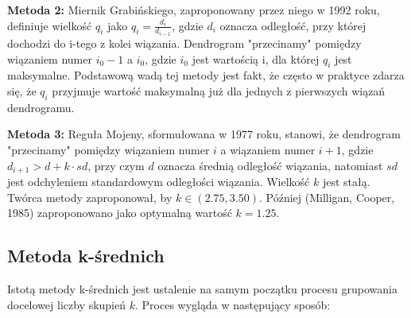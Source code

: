 \documentclass{article}
\begin{document}
\textbf{Metoda 2:} Miernik Grabińskiego, zaproponowany przez niego w 1992 roku, definiuje wielkość $q_i$ jako $q_i = \frac{d_i}{d_{i-1}}$, gdzie $d_i$ oznacza odległość, przy której dochodzi do i-tego z kolei wiązania. Dendrogram "przecinamy" pomiędzy wiązaniem numer $i_0 - 1$ a $i_0$, gdzie $i_0$ jest wartością i, dla której $q_i$ jest maksymalne. Podstawową wadą tej metody jest fakt, że często w praktyce zdarza się, że $q_i$ przyjmuje wartość maksymalną już dla jednych z pierwszych wiązań dendrogramu.

\textbf{Metoda 3:} Reguła Mojeny, sformułowana w 1977 roku, stanowi, że dendrogram "przecinamy" pomiędzy wiązaniem numer $i$ a wiązaniem numer $i + 1$, gdzie $d_{i+1} > d + k \cdot sd$, przy czym $d$ oznacza średnią odległość wiązania, natomiast $sd$ jest odchyleniem standardowym odległości wiązania. Wielkość $k$ jest stałą. Twórca metody zaproponował, by $k \in (2.75, 3.50)$. Później (Milligan, Cooper, 1985) zaproponowano jako optymalną wartość $k = 1.25$.

\subsection{Metoda k-średnich}

Istotą metody k-średnich jest ustalenie na samym początku procesu grupowania docelowej liczby skupień $k$. Proces wygląda w następujący sposób: 
\end{document}
